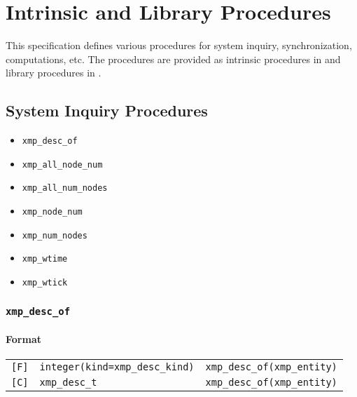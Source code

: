 \chapter{Intrinsic and Library Procedures}
\label{chap:Intrinsic and library procedures}

This specification defines various procedures for system inquiry,
synchronization, computations, etc. The procedures are provided as
intrinsic procedures in {\XMPF} and library procedures in {\XMPC}.

\section{System Inquiry Procedures}

\begin{itemize}
 \item {\tt xmp\_desc\_of}
 \item {\tt xmp\_all\_node\_num}
 \item {\tt xmp\_all\_num\_nodes}
 \item {\tt xmp\_node\_num}
 \item {\tt xmp\_num\_nodes}
 \item {\tt xmp\_wtime}
 \item {\tt xmp\_wtick}
\end{itemize}

\subsection{\tt xmp\_desc\_of}
\label{subsec: xmp_desc_of}

\subsubsection*{Format}

\begin{tabular}{lll}

\verb![F]!&  {\tt integer(kind=xmp\_desc\_kind)}& {\tt xmp\_desc\_of(xmp\_entity)}\\

\verb![C]!&  {\tt xmp\_desc\_t}& {\tt xmp\_desc\_of(xmp\_entity)}

\end{tabular}

\vspace{0.3cm}

